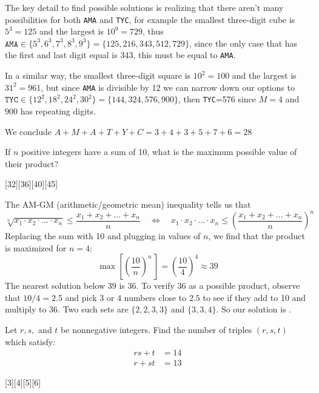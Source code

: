 \begin{solution}[D]
    The key detail to find possible solutions is realizing that there aren't many possibilities for both \texttt{AMA} and \texttt{TYC}, for example the smallest three-digit cube is $5^3=125$ and the largest is $10^9=729$, thus $\texttt{AMA} \in \{ 5^3,6^3,7^3,8^3,9^3\}= \{ 125,216,343,512,729\}$, since the only case that has the first and last digit equal is 343, this must be equal to \texttt{AMA}.
    
    In a similar way, the smallest three-digit square is $10^2=100$ and the largest is $31^2=961$, but since \texttt{AMA} is divisible by 12 we can narrow down our options to $\texttt{TYC} \in \{12^2,18^2,24^2,30^2 \} = \{144,324,576,900 \}$, then \texttt{TYC}=576 since $M=4$ and $900$ has repeating digits.
    
    We conclude $ A + M + A + T + Y + C =3+4+3+5+7+6= \boxed{28} $
\end{solution}

\begin{problem}
    If \( n \) positive integers have a sum of 10, what is the maximum possible value of their product?
\end{problem}
[32][36][40][45]

\begin{solution}[C]
    The AM-GM (arithmetic/geometric mean) inequality tells us that
    \[
        \sqrt[n]{x_1 \cdot x_2 \cdot \dots \cdot x_n} \leq \frac{x_1 + x_2 + \dots + x_n}{n} \quad \iff \quad x_1 \cdot x_2 \cdot \dots \cdot x_n \leq \left(\frac{x_1 + x_2 + \dots + x_n}{n}\right)^{\!\!n}
    \]
    Replacing the sum with 10 and plugging in values of $n$, we find that the product is maximized for $n=4$:
    \[
    \max\!\left[ \left(\frac{10} {n}\right)^{\!\!n}\, \right] =\displaystyle \left(\frac{10} {4}\right)^{\!\!4} \approx 39
    \]
    The nearest solution below $39$ is $36$. To verify $36$ as a possible product, observe that $10/4=2.5$ and pick $3$ or $4$ numbers close to $2.5$ to see if they add to 10 and multiply to 36. Two such sets are $\{2,2,3,3\}$ and $\{3,3,4\}$. So our solution is .
\end{solution}

\newpageSol

\begin{problem}
    Let \( r, s, \) and \( t \) be nonnegative integers. Find the number of triples \( (r, s, t) \) which satisfy:\vspace{-2mm}
    \begin{align*}
        rs + t &= 14 \\
        r + st &= 13
    \end{align*}
\end{problem}\vspace{-3mm}
[3][4][5][6]

